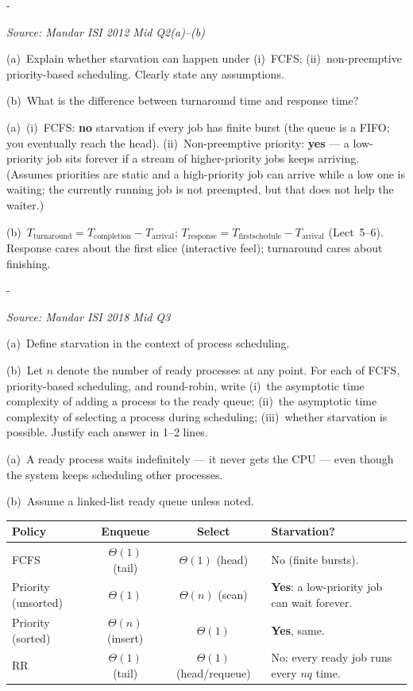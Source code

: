 \documentclass[11pt,a4paper]{article}
\makeatletter
\newcommand{\keepspace}[1]{\par\penalty-100\begingroup
  \setlength{\dimen@}{#1}\dimen@ii\pagegoal\advance\dimen@ii-\pagetotal
  \ifdim\dimen@>\dimen@ii\ifdim\dimen@ii>\z@\vfil\fi\break\fi\endgroup}
\newcounter{qn}[section]
\newenvironment{Qn}[4]{%
  \refstepcounter{qn}\keepspace{7\baselineskip}%
  \begin{tcolorbox}[qboxstyle, title={Q\thesection.\theqn\ \ [#1 \textbar\ #2]\ \ #4}]%
  {\footnotesize\color{g3}\textit{Source: #3}}\par\smallskip%
}{%
  \end{tcolorbox}%
}
\newenvironment{Sol}{%
  \begin{tcolorbox}[sboxstyle, title={Solution}]%
}{%
  \end{tcolorbox}\vspace{0.35em}%
}
\makeatother
\begin{document}
\begin{Qn}{Easy-Medium}{Lect 5--6}{Mandar ISI 2012 Mid Q2(a)--(b)}{Starvation under FCFS vs.\ priority; TAT vs.\ response}
(a)~Explain whether starvation can happen under (i)~FCFS; (ii)~non-preemptive priority-based scheduling. Clearly state any assumptions.

(b)~What is the difference between turnaround time and response time?
\end{Qn}
\begin{Sol}
(a)~(i)~FCFS: \textbf{no} starvation if every job has finite burst (the queue is a FIFO; you eventually reach the head). (ii)~Non-preemptive priority: \textbf{yes} --- a low-priority job sits forever if a stream of higher-priority jobs keeps arriving. (Assumes priorities are static and a high-priority job can arrive while a low one is waiting; the currently running job is not preempted, but that does not help the waiter.)

(b)~$T_{\mathrm{turnaround}} = T_{\mathrm{completion}}-T_{\mathrm{arrival}}$; $T_{\mathrm{response}} = T_{\mathrm{firstschedule}}-T_{\mathrm{arrival}}$ (Lect~5--6). Response cares about the first slice (interactive feel); turnaround cares about finishing.
\end{Sol}

\begin{Qn}{Easy-Medium}{Lect 5--6}{Mandar ISI 2018 Mid Q3}{Define starvation; FCFS / priority / RR: enqueue, select, starve?}
(a)~Define starvation in the context of process scheduling.

(b)~Let $n$ denote the number of ready processes at any point. For each of FCFS, priority-based scheduling, and round-robin, write (i)~the asymptotic time complexity of adding a process to the ready queue; (ii)~the asymptotic time complexity of selecting a process during scheduling; (iii)~whether starvation is possible. Justify each answer in 1--2 lines.
\end{Qn}
\begin{Sol}
(a)~A ready process waits indefinitely --- it never gets the CPU --- even though the system keeps scheduling other processes.

(b)~Assume a linked-list ready queue unless noted.
\begin{center}
\small
\begin{tabularx}{\linewidth}{@{}lccX@{}}
\hline
Policy & Enqueue & Select & Starvation? \\
\hline
FCFS & $\Theta(1)$ (tail) & $\Theta(1)$ (head)
  & No (finite bursts). \\
Priority (unsorted)
  & $\Theta(1)$ & $\Theta(n)$ (scan)
  & \textbf{Yes}: a low-priority job can wait forever. \\
Priority (sorted)
  & $\Theta(n)$ (insert) & $\Theta(1)$
  & \textbf{Yes}, same. \\
RR & $\Theta(1)$ (tail) & $\Theta(1)$ (head/requeue)
  & No: every ready job runs every $n q$ time. \\
\hline
\end{tabularx}
\end{center}
\end{Sol}
\end{document}
